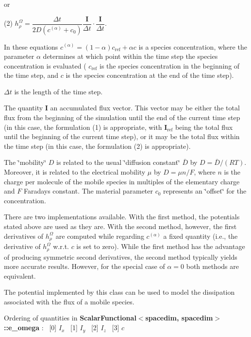 or

(2) $h^\Omega_\rho = \dfrac{\Delta t}{2 D ( c^{(\alpha)} + c_0 ) } \dfrac{\boldsymbol{I}}{\Delta t} \cdot \dfrac{\boldsymbol{I}}{\Delta t}$.

In these equations $c^{(\alpha)} = (1-\alpha)c_\mathrm{ref} + \alpha c$ is a species concentration, where the parameter $\alpha$ determines at which point within the time step the species concentration is evaluated ( $c_\mathrm{ref}$ is the species concentration in the beginning of the time step, and $c$ is the species concentration at the end of the time step).

$\Delta t$ is the length of the time step.

The quantity $\boldsymbol{I}$ an accumulated flux vector. This vector may be either the total flux from the beginning of the simulation until the end of the current time step (in this case, the formulation (1) is appropriate, with $\boldsymbol{I}_\mathrm{ref}$ being the total flux until the beginning of the current time step), or it may be the total flux within the time step (in this case, the formulation (2) is appropriate).

The \char`\"{}mobility\char`\"{} $D$ is related to the usual \char`\"{}diffusion constant\char`\"{} $ \bar D $ by $D = \bar D/(RT)$. Moreover, it is related to the electrical mobility $\mu$ by $ D = \mu n/F$, where $n$ is the charge per molecule of the mobile species in multiples of the elementary charge and $F$ Faraday\textquotesingle{}s constant. The material parameter $c_0$ represents an \char`\"{}offset\char`\"{} for the concentration.

There are two implementations available. With the first method, the potentials stated above are used as they are. With the second method, however, the first derivatives of $h^\Omega_\rho$ are computed while regarding $c^{(\alpha)}$ a fixed quantity (i.\+e., the derivative of $h^\Omega_\rho$ w.\+r.\+t. $c$ is set to zero). While the first method has the advantage of producing symmetric second derivatives, the second method typically yields more accurate results. However, for the special case of $\alpha = 0$ both methods are equivalent.

The potential implemented by this class can be used to model the dissipation associated with the flux of a mobile species.

Ordering of quantities in {\bf Scalar\+Functional$<$spacedim, spacedim$>$\+::e\+\_\+omega} \+:~\newline
\mbox{[}0\mbox{]} $I_x$~\newline
 \mbox{[}1\mbox{]} $I_y$~\newline
 \mbox{[}2\mbox{]} $I_z$~\newline
 \mbox{[}3\mbox{]} $c$ 


